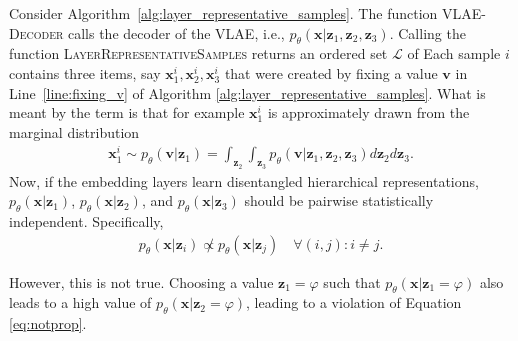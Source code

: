 Consider Algorithm~\ref{alg:layer_representative_samples}.
The function \textsc{VLAE-Decoder} calls the decoder of the \ac{VLAE}, i.e., $p_\theta(\bm{x} | \bm{z}_1, \bm{z}_2, \bm{z}_3)$.
Calling the function \textsc{LayerRepresentativeSamples} returns an ordered set $\mathcal{L}$ of 
Each sample $i$ contains three items, say $\bm{x}_1^i, \bm{x}_2^i, \bm{x}_3^i$ that were created by fixing a value $\bm{v}$ in Line~\ref{line:fixing_v} of Algorithm \ref{alg:layer_representative_samples}.
What is meant by the term  is that for example $\bm{x}_1^i$ is approximately drawn from the marginal distribution
\begin{align}
    \bm{x}_1^i \sim p_\theta(\bm{v} | \bm{z}_1) = \int_{\bm{z}_2} \int_{\bm{z}_3} p_\theta(\bm{v} | \bm{z}_1, \bm{z}_2, \bm{z}_3) d\bm{z}_2 d\bm{z}_3.
\end{align}
Now, if the embedding layers learn disentangled hierarchical representations, $p_\theta(\bm{x} | \bm{z}_1)$, $p_\theta(\bm{x} | \bm{z}_2)$, and $p_\theta(\bm{x} | \bm{z}_3)$ should be pairwise statistically independent.
Specifically,
\begin{align}
    p_\theta(\bm{x} | \bm{z}_i) \not \propto p_\theta(\bm{x} | \bm{z}_j) \quad \forall (i,j):i\neq j. \label{eq:notprop}
\end{align}

However, this is not true.
Choosing a value $\bm{z}_1 = \varphi$ such that $p_\theta(\bm{x} | \bm{z}_1 = \varphi)$ also leads to a high value of $p_\theta(\bm{x} | \bm{z}_2 = \varphi)$, leading to a violation of Equation \ref{eq:notprop}.

